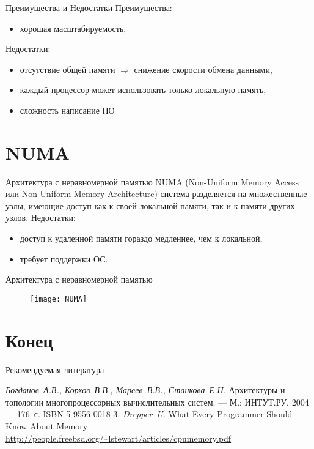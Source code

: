 \begin{frame}{Преимущества и Недостатки}
Преимущества:
\begin{itemize}
    \item хорошая масштабируемость,
\end{itemize}
\vfill
Недостатки:
\begin{itemize}
    \item отсутствие общей памяти $\Rightarrow$ снижение скорости обмена данными,
    \item каждый процессор может использовать только локальную память,
    \item сложность написание ПО
\end{itemize}
\end{frame}

\section{NUMA}

\begin{frame}{Архитектура с неравномерной памятью}
NUMA (Non-Uniform Memory Access или Non-Uniform Memory Architecture) система разделяется на множественные узлы, имеющие доступ как к своей локальной памяти, так и к памяти других узлов.
\vfill
Недостатки:
\begin{itemize}
    \item доступ к удаленной памяти гораздо медленнее, чем к локальной,
    \item требует поддержки ОС.
\end{itemize}
\end{frame}

\begin{frame}{Архитектура с неравномерной памятью}
\begin{figure}[htpb]
    \centering
    \texttt{[image: NUMA]}
\end{figure}
\end{frame}

\section*{Конец}

\begin{frame}[allowframebreaks]{Рекомендуемая литература}
\begin{thebibliography}{99}
    \bibitem{} \textit{Богданов~А.В., Корхов~В.В., Мареев~В.В., Станкова~Е.Н.}
    Архитектуры и топологии многопроцессорных вычислительных систем. --- М.:
    ИНТУТ.РУ, 2004 --- 176~с. ISBN 5-9556-0018-3.
    \bibitem{} \textit{Drepper~U.} What Every Programmer Should Know About Memory
    \url{http://people.freebsd.org/~lstewart/articles/cpumemory.pdf}
\end{thebibliography}
\end{frame}


